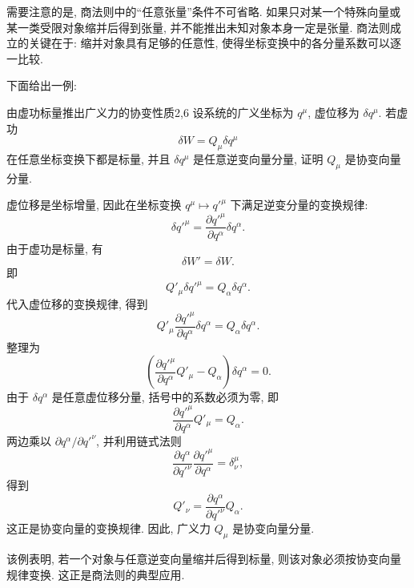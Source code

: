 需要注意的是, 商法则中的“任意张量”条件不可省略. 如果只对某一个特殊向量或某一类受限对象缩并后得到张量, 并不能推出未知对象本身一定是张量. 商法则成立的关键在于: 缩并对象具有足够的任意性, 使得坐标变换中的各分量系数可以逐一比较. 

下面给出一例:
\begin{example}{由虚功标量推出广义力的协变性质}{2,6}
	设系统的广义坐标为 $q^{\mu}$, 虚位移为 $\delta q^{\mu}$. 若虚功
	\[
	\delta W
	=
	Q_{\mu}\delta q^{\mu}
	\]
	在任意坐标变换下都是标量, 并且 $\delta q^{\mu}$ 是任意逆变向量分量, 证明 $Q_{\mu}$ 是协变向量分量. 
	
	\begin{solution}
		虚位移是坐标增量, 因此在坐标变换 $q^{\mu}\mapsto q'^{\mu}$ 下满足逆变分量的变换规律: 
		\[
		\delta q'^{\mu}
		=
		\frac{\partial q'^{\mu}}{\partial q^{\alpha}}
		\delta q^{\alpha}.
		\]
		由于虚功是标量, 有
		\[
		\delta W'
		=
		\delta W.
		\]
		即
		\[
		Q'_{\mu}\delta q'^{\mu}
		=
		Q_{\alpha}\delta q^{\alpha}.
		\]
		代入虚位移的变换规律, 得到
		\[
		Q'_{\mu}
		\frac{\partial q'^{\mu}}{\partial q^{\alpha}}
		\delta q^{\alpha}
		=
		Q_{\alpha}\delta q^{\alpha}.
		\]
		整理为
		\[
		\left(
		\frac{\partial q'^{\mu}}{\partial q^{\alpha}}Q'_{\mu}
		-
		Q_{\alpha}
		\right)\delta q^{\alpha}
		=
		0.
		\]
		由于 $\delta q^{\alpha}$ 是任意虚位移分量, 括号中的系数必须为零, 即
		\[
		\frac{\partial q'^{\mu}}{\partial q^{\alpha}}Q'_{\mu}
		=
		Q_{\alpha}.
		\]
		两边乘以 $\partial q^{\alpha}/\partial q'^{\nu}$, 并利用链式法则
		\[
		\frac{\partial q^{\alpha}}{\partial q'^{\nu}}
		\frac{\partial q'^{\mu}}{\partial q^{\alpha}}
		=
		\delta^{\mu}_{\nu},
		\]
		得到
		\[
		Q'_{\nu}
		=
		\frac{\partial q^{\alpha}}{\partial q'^{\nu}}Q_{\alpha}.
		\]
		这正是协变向量的变换规律. 因此, 广义力 $Q_{\mu}$ 是协变向量分量. 
		
		该例表明, 若一个对象与任意逆变向量缩并后得到标量, 则该对象必须按协变向量规律变换. 这正是商法则的典型应用. 
	\end{solution}
\end{example}

